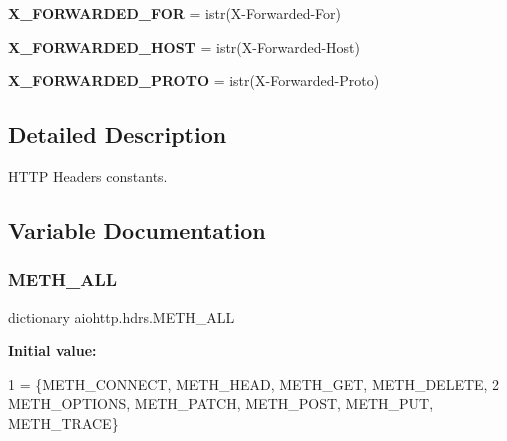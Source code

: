\begin{DoxyCompactItemize}
\item 
\mbox{\label{namespaceaiohttp_1_1hdrs_a48cfabe7f1c58c72b97ed942486a0f4e}} 
{\bfseries X\+\_\+\+F\+O\+R\+W\+A\+R\+D\+E\+D\+\_\+\+F\+OR} = istr(\textquotesingle{}X-\/Forwarded-\/For\textquotesingle{})
\item 
\mbox{\label{namespaceaiohttp_1_1hdrs_ab833abce42ab39ebec913e3475d81b4a}} 
{\bfseries X\+\_\+\+F\+O\+R\+W\+A\+R\+D\+E\+D\+\_\+\+H\+O\+ST} = istr(\textquotesingle{}X-\/Forwarded-\/Host\textquotesingle{})
\item 
\mbox{\label{namespaceaiohttp_1_1hdrs_aecf0f68cf5ec4d3969b833248b762ebc}} 
{\bfseries X\+\_\+\+F\+O\+R\+W\+A\+R\+D\+E\+D\+\_\+\+P\+R\+O\+TO} = istr(\textquotesingle{}X-\/Forwarded-\/Proto\textquotesingle{})
\end{DoxyCompactItemize}


\subsection{Detailed Description}
\begin{DoxyVerb}HTTP Headers constants.\end{DoxyVerb}
 

\subsection{Variable Documentation}
\mbox{\label{namespaceaiohttp_1_1hdrs_ac285323a1d34a31796e76e3439647cea}} 
\subsubsection{\texorpdfstring{M\+E\+T\+H\+\_\+\+A\+LL}{METH\_ALL}}
{\footnotesize\ttfamily dictionary aiohttp.\+hdrs.\+M\+E\+T\+H\+\_\+\+A\+LL}

{\bfseries Initial value\+:}
\begin{DoxyCode}
1 =  \{METH\_CONNECT, METH\_HEAD, METH\_GET, METH\_DELETE,
2             METH\_OPTIONS, METH\_PATCH, METH\_POST, METH\_PUT, METH\_TRACE\}
\end{DoxyCode}
